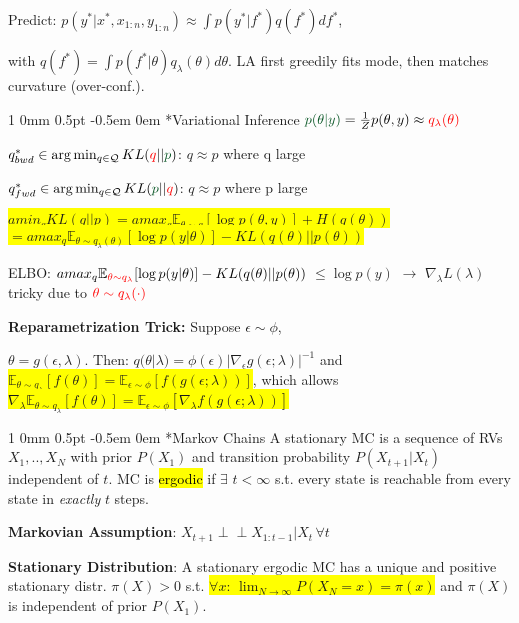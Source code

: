 \documentclass[11pt,landscape,a4paper,fleqn]{article}
\makeatletter
\newcommand*{\rsection}{%
	\@startsection{section}%
	{1}%
	{0mm}%
	{0.5pt}%
	{-0.5em \@plus 0em}
	{\color{myorange}\sffamily\small\bfseries}}
\newcommand{\mhl}[1]{\setlength{\fboxsep}{0pt}\colorbox{yellow}{#1}}
\newcommand{\indep}{\perp\!\!\!\perp}
\makeatother
\begin{document}
\begin{multicols*}{4}
Predict: $p(y^*| x^*, x_{1:n}, y_{1:n}) \approx \int p(y^* | f^*) q(f^*) df^*$,

\vspace*{-1mm}
with $q(f^*) = \int p(f^* | \theta) q_\lambda(\theta) d\theta$.  LA first greedily fits mode, then matches curvature (over-conf.).

\rsection*{Variational Inference} {\fontsize{9.5}{6}\selectfont $\textcolor{darkgreen}{p(\theta | y)} = \frac{1}{Z} p(\theta, y) \approx \textcolor{red}{q_\lambda(\theta)}$}

$q_{bwd}^* \in \arg\min_{q \in \mathcal{Q}} KL(\textcolor{red}{q} || \textcolor{darkgreen}{p})$: $q \approx p$ where q large

$q_{fwd}^* \in \arg\min_{q \in \mathcal{Q}} KL(\textcolor{darkgreen}{p} || \textcolor{red}{q})$: $q \approx p$ where p large

\mhl{$amin_q KL(q||p) = amax_q \mathbb{E}_{\theta \sim q}[\log p(\theta, y)] + H(q(\theta))$}
\mhl{$ = 	amax_q \mathbb{E}_{\theta \sim q_\lambda(\theta)}[\log p(y | \theta)] - KL(q(\theta)||p(\theta))$}

ELBO: $amax_{q} \mathbb{E}_{\textcolor{red}{\theta \sim q_\lambda}} [\log p(y | \theta)] - KL(q(\theta)||p(\theta))$ $ \leq \log p(y)$ $\rightarrow$ $\nabla_\lambda L(\lambda)$ tricky due to $\textcolor{red}{\theta \sim q_\lambda(\cdot)}$

\textbf{Reparametrization Trick:} Suppose $\epsilon \sim \phi$, 

\vspace*{-1mm}
$\theta = g(\epsilon, \lambda)$. Then: $q(\theta | \lambda) = \phi(\epsilon) |\nabla_\epsilon g(\epsilon; \lambda)|^{-1}$ and \mhl{$\mathbb{E}_{\theta \sim q_\lambda}[f(\theta)] = \mathbb{E}_{\epsilon \sim \phi}[f(g(\epsilon; \lambda))]$}, which allows \mhl{$\nabla_\lambda \mathbb{E}_{\theta \sim q_\lambda}[f(\theta)] = \mathbb{E}_{\epsilon \sim \phi}[\nabla_\lambda f(g(\epsilon; \lambda))]$}

\rsection*{Markov Chains} A stationary MC is a sequence of RVs $X_1,..,X_N$ with prior $P(X_1)$ and transition probability $P(X_{t+1} | X_t)$ independent of $t$. MC is \hl{ergodic} if $\exists$ $t < \infty$ s.t. every state is reachable from every state in \textit{exactly} $t$ steps.

\textbf{Markovian Assumption}: $X_{t+1} \indep X_{1:t-1} | X_t \, \forall t$

\textbf{Stationary Distribution}: A stationary ergodic MC has a unique and positive stationary distr. $\pi(X) > 0$ s.t. \mhl{$\forall x$: $\lim_{N \rightarrow \infty} P(X_N = x) = \pi(x)$} and $\pi(X)$ is independent of prior $P(X_1)$.


\end{multicols*}
\end{document}
